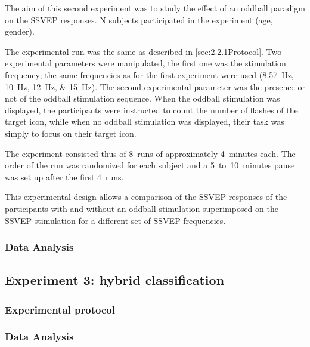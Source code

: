 \documentclass[10pt]{article}
\begin{document}
        The aim of this second experiment was to study the effect of an oddball paradigm on the \ac{SSVEP} responses.
        N subjects participated in the experiment (age, gender).

        The experimental run was the same as described in \autoref{sec:2.2.1Protocol}.
        Two experimental parameters were manipulated, the first one was the stimulation frequency; the same frequencies as for the first experiment were used (\SIlist[list-units = single]{8.57;10;12;15}{\Hz}).
        The second experimental parameter was the presence or not of the oddball stimulation sequence.
        When the oddball stimulation was displayed, the participants were instructed to count the number of flashes of the target icon, while when no oddball stimulation was displayed, their task was simply to focus on their target icon.
        
        The experiment consisted thus of 8~runs of approximately 4~minutes each.
        The order of the run was randomized for each subject and a 5~to~10~minutes pause was set up after the first 4~runs.

        This experimental design allows a comparison of the \ac{SSVEP} responses of the participants with and without an oddball stimulation superimposed on the \ac{SSVEP} stimulation for a different set of \ac{SSVEP} frequencies.


        \subsubsection{Data Analysis}
        \label{sec:2.3.2Analysis}
        
        
        


    \subsection{Experiment 3: hybrid classification}
    \label{sec:2.4Hybrid}

        \subsubsection{Experimental protocol}
        \label{sec:2.4.1Protocol}

        \subsubsection{Data Analysis}
        \label{sec:2.4.2Analysis}
\end{document}
